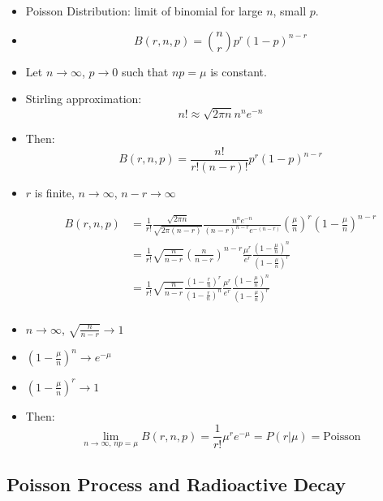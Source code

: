 \begin{itemize}
      \item Poisson Distribution: limit of binomial for large $n$, small $p$.
      \item
            \[ B(r,n,p) = \binom{n}{r} p^r (1-p)^{n-r} \]
      \item Let $n \rightarrow \infty$, $p \rightarrow 0$ such that $np = \mu$ is constant.
      \item Stirling approximation:
            \[ n! \approx \sqrt{2 \pi n}  n^n e^{-n} \]
      \item Then:
            \[ B(r,n,p) = \frac{n!}{r!(n-r)!} p^r (1-p)^{n-r} \]
      \item $r$ is finite, $n \rightarrow \infty$, $n-r \rightarrow \infty$

            \begin{align*}
                  B(r,n,p) & = \frac{1}{r!} \frac{\sqrt{2 \pi n}}{\sqrt{2 \pi (n-r)}} \frac{n^n e^{-n}}{(n-r)^{n-r} e^{-(n-r)}} \left(\frac{\mu}{n}\right)^r \left(1-\frac{\mu}{n}\right)^{n-r}          \\
                           & = \frac{1}{r!} \sqrt{\frac{n}{n-r}} \left( \frac{n}{n-r} \right)^{n-r} \frac{\mu^r}{e^r} \frac{\left(1-\frac{\mu}{n}\right)^{n}}{\left(1-\frac{\mu}{n}\right)^r}            \\
                           & = \frac{1}{r!} \sqrt{\frac{n}{n-r}} \frac{(1-\frac{r}{n})^r}{(1-\frac{r}{n})^{n}} \frac{\mu^r}{e^r} \frac{\left(1-\frac{\mu}{n}\right)^{n}}{\left(1-\frac{\mu}{n}\right)^r} \\
            \end{align*}

      \item $n\rightarrow \infty$, $\sqrt{\frac{n}{n-r}} \rightarrow 1$
      \item $\left(1-\frac{\mu}{n}\right)^n \rightarrow e^{-\mu}$
      \item $\left(1-\frac{\mu}{n}\right)^r \rightarrow 1$
      \item Then:
            \[ \lim_{n\rightarrow \infty,\, np = \mu} B(r,n,p) = \frac{1}{r!} \mu^r e^{-\mu} = P(r|\mu) = \text{Poisson} \]
\end{itemize}

\subsection{Poisson Process and Radioactive Decay}

